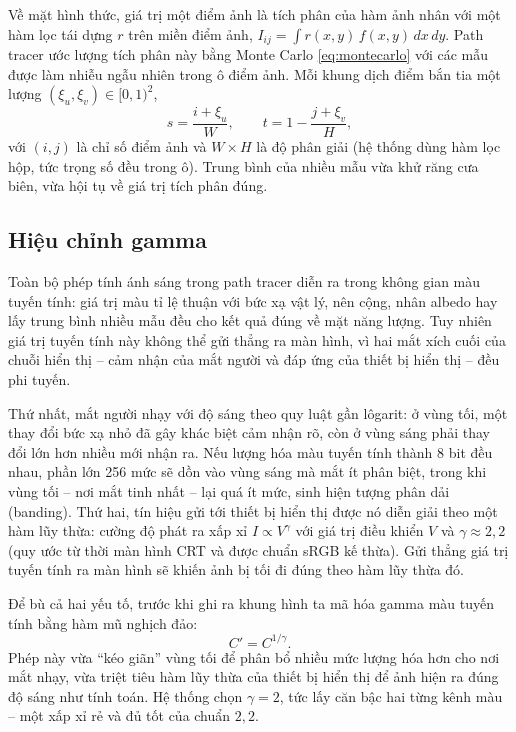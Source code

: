 Về mặt hình thức, giá trị một điểm ảnh là tích phân của hàm ảnh nhân với một
hàm lọc tái dựng $r$ trên miền điểm ảnh, $I_{ij} = \int r(x,y)\,f(x,y)\,
dx\,dy$. Path tracer ước lượng tích phân này bằng Monte Carlo
\eqref{eq:montecarlo} với các mẫu được làm nhiễu ngẫu nhiên trong ô điểm ảnh.
Mỗi khung dịch điểm bắn tia một lượng $(\xi_u,\xi_v)\in[0,1)^2$,
\begin{equation}
s = \frac{i + \xi_u}{W}, \qquad t = 1 - \frac{j + \xi_v}{H},
\end{equation}
với $(i,j)$ là chỉ số điểm ảnh và $W\times H$ là độ phân giải (hệ thống dùng hàm
lọc hộp, tức trọng số đều trong ô). Trung bình của nhiều mẫu vừa khử răng cưa
biên, vừa hội tụ về giá trị tích phân đúng.

\subsection{Hiệu chỉnh gamma}
Toàn bộ phép tính ánh sáng trong path tracer diễn ra trong không gian màu tuyến
tính: giá trị màu tỉ lệ thuận với bức xạ vật lý, nên cộng, nhân albedo hay lấy
trung bình nhiều mẫu đều cho kết quả đúng về mặt năng lượng. Tuy nhiên giá trị
tuyến tính này không thể gửi thẳng ra màn hình, vì hai mắt xích cuối của chuỗi
hiển thị -- cảm nhận của mắt người và đáp ứng của thiết bị hiển thị -- đều phi
tuyến.

Thứ nhất, mắt người nhạy với độ sáng theo quy luật gần lôgarit: ở vùng tối, một
thay đổi bức xạ nhỏ đã gây khác biệt cảm nhận rõ, còn ở vùng sáng phải thay đổi
lớn hơn nhiều mới nhận ra. Nếu lượng hóa màu tuyến tính thành 8 bit đều nhau, phần
lớn 256 mức sẽ dồn vào vùng sáng mà mắt ít phân biệt, trong khi vùng tối -- nơi
mắt tinh nhất -- lại quá ít mức, sinh hiện tượng phân dải (banding). Thứ hai, tín
hiệu gửi tới thiết bị hiển thị được nó diễn giải theo một hàm lũy thừa: cường độ
phát ra xấp xỉ $I \propto V^{\gamma}$ với giá trị điều khiển $V$ và $\gamma\approx
2{,}2$ (quy ước từ thời màn hình CRT và được chuẩn sRGB kế thừa). Gửi thẳng giá
trị tuyến tính ra màn hình sẽ khiến ảnh bị tối đi đúng theo hàm lũy thừa đó.

Để bù cả hai yếu tố, trước khi ghi ra khung hình ta mã hóa gamma màu tuyến
tính bằng hàm mũ nghịch đảo:
\begin{equation}
\label{eq:gamma}
C' = C^{1/\gamma}.
\end{equation}
Phép này vừa ``kéo giãn'' vùng tối để phân bổ nhiều mức lượng hóa hơn cho nơi mắt
nhạy, vừa triệt tiêu hàm lũy thừa của thiết bị hiển thị để ảnh hiện ra đúng độ
sáng như tính toán. Hệ thống chọn $\gamma = 2$, tức lấy căn bậc hai từng kênh màu
-- một xấp xỉ rẻ và đủ tốt của chuẩn $2{,}2$.

